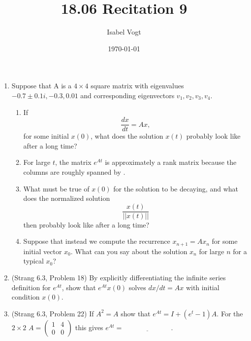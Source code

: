\documentclass[11pt]{article}
\title{18.06 Recitation 9}
\author{Isabel Vogt}
\date{\today}                                           %
\begin{document}
\maketitle

\begin{enumerate}

\item Suppose that A is a $4\times4$ square matrix with eigenvalues $-0.7 \pm 0.1i, -0.3, 0.01$ and corresponding eigenvectors $v_1, v_2, v_3, v_4$.
\begin{enumerate}
\item  If 
\[\frac{dx}{dt} = Ax,\]
 for some initial $x(0)$, what does the solution $x(t)$ probably look like after a long time?
\item For large $t$, the matrix $e^{At}$ is approximately a rank \underline{\phantom{aaaaaa}} matrix because the columns are roughly spanned by \underline{\phantom{aaaaaa}}.
\item What must be true of $x(0)$ for the solution to be decaying, and what does the normalized solution 
\[\frac{x(t)}{||x(t)||}\] 
then probably look like after a long time?
\item Suppose that instead we compute the recurrence $x_{n+1}=Ax_n$ for some initial vector $x_0$.   What can you say about the solution $x_n$ for large $n$ for a typical $x_0$?
\end{enumerate}


\item  (Strang 6.3, Problem 18) By explicitly differentiating the infinite series definition for $e^{At}$, show that $e^{At} x(0) $ solves $dx/dt = Ax$ with initial condition $x(0)$.

\item (Strang 6.3, Problem 22) If $A^2 = A$ show that $e^{At} = I + (e^t - 1)A$.  For the $2\times2$ $A = \begin{pmatrix} 1 & 4 \\ 0 & 0 \end{pmatrix}$ this gives $e^{At} = \underline{\phantom{aaaaaaaaaaaaa}}$.



\end{enumerate}
\end{document}
